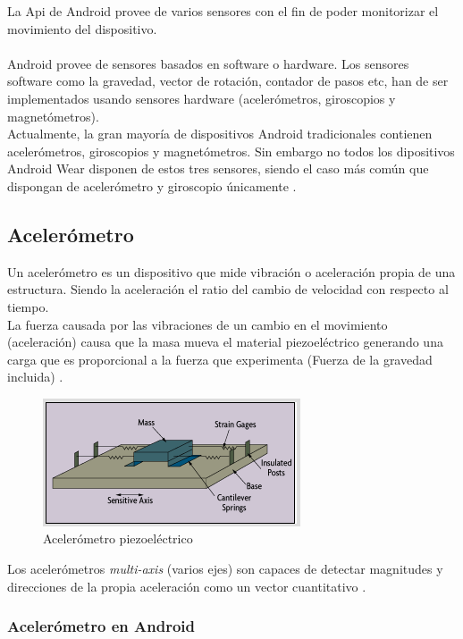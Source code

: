La Api de Android provee de varios sensores con el fin de poder monitorizar el movimiento del dispositivo.
\\
\\
Android provee de sensores basados en software o hardware. Los sensores software como la gravedad, vector de rotación, contador de pasos etc, han de ser implementados usando sensores hardware (acelerómetros, giroscopios y magnetómetros).
\\
Actualmente, la gran mayoría de dispositivos Android tradicionales contienen acelerómetros, giroscopios y magnetómetros. Sin embargo no todos los dipositivos Android Wear disponen de estos tres sensores, siendo el caso más común que dispongan de acelerómetro y giroscopio únicamente \cite{SensorGoogle}.

\subsection{Acelerómetro}

Un acelerómetro es un dispositivo que mide vibración o aceleración propia de una estructura. Siendo la aceleración el ratio del cambio de velocidad con respecto al tiempo.
\\
La fuerza causada por las vibraciones de un cambio en el movimiento (aceleración) causa que la masa mueva el material piezoeléctrico generando una carga que es proporcional a la fuerza que experimenta (Fuerza de la gravedad incluida) .

\begin{figure}[H]
	\centering
	\includegraphics[scale=0.7]{imagenes/piezoelectrico.png}
	\caption{Acelerómetro piezoeléctrico}
	\label{Accelerometer}
\end{figure}
\noindent
Los acelerómetros \textit{multi-axis} (varios ejes) son capaces de detectar magnitudes y direcciones de la propia aceleración como un vector cuantitativo \cite{WikipediaAccelerometer}.


\subsubsection{Acelerómetro en Android}

